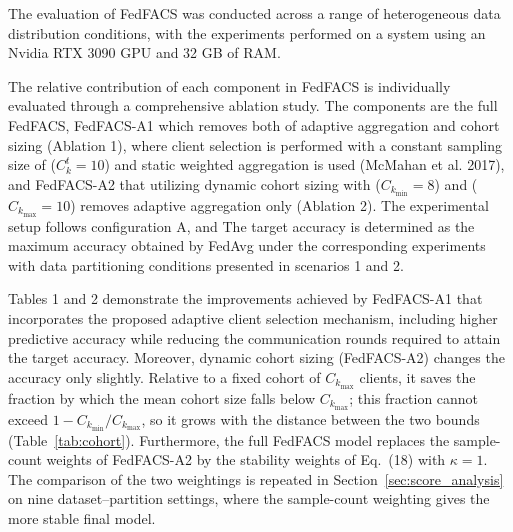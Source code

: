 \documentclass[pdflatex,sn-mathphys-num,oneside]{sn-jnl}%
\theoremstyle{thmstyleone}%
\theoremstyle{thmstyletwo}%
\theoremstyle{thmstylethree}%
\begin{document}
The evaluation of FedFACS was conducted across a range of heterogeneous data distribution conditions, with the experiments performed on a system using an Nvidia RTX 3090 GPU and 32 GB of RAM.

The relative contribution of each component in FedFACS is individually evaluated through a comprehensive ablation study. The components are the full FedFACS, FedFACS-A1 which removes both of adaptive aggregation and cohort sizing (Ablation 1), where client selection is performed with a constant sampling size of ($C_k^t=10$) and static weighted aggregation is used (McMahan et al. 2017), and FedFACS-A2 that utilizing dynamic cohort sizing with ($C_{k_{\min}} = 8$) and ($C_{k_{\max}} = 10$) removes adaptive aggregation only (Ablation 2). The experimental setup follows configuration A, and The target accuracy is determined as the maximum accuracy obtained by FedAvg under the corresponding experiments with data partitioning conditions presented in scenarios 1 and 2.

Tables 1 and 2 demonstrate the improvements achieved by FedFACS-A1 that incorporates the proposed adaptive client selection mechanism, including higher predictive accuracy while reducing the communication rounds required to attain the target accuracy. Moreover, dynamic cohort sizing (FedFACS-A2) changes the accuracy only slightly. Relative to a fixed cohort of $C_{k_{\max}}$ clients, it saves the fraction by which the mean cohort size falls below $C_{k_{\max}}$; this fraction cannot exceed $1-C_{k_{\min}}/C_{k_{\max}}$, so it grows with the distance between the two bounds (Table~\ref{tab:cohort}). Furthermore, the full FedFACS model replaces the sample-count weights of FedFACS-A2 by the stability weights of Eq.~(18) with $\kappa=1$. The comparison of the two weightings is repeated in Section~\ref{sec:score_analysis} on nine dataset--partition settings, where the sample-count weighting gives the more stable final model.

\FloatBarrier

\FloatBarrier
\end{document}
